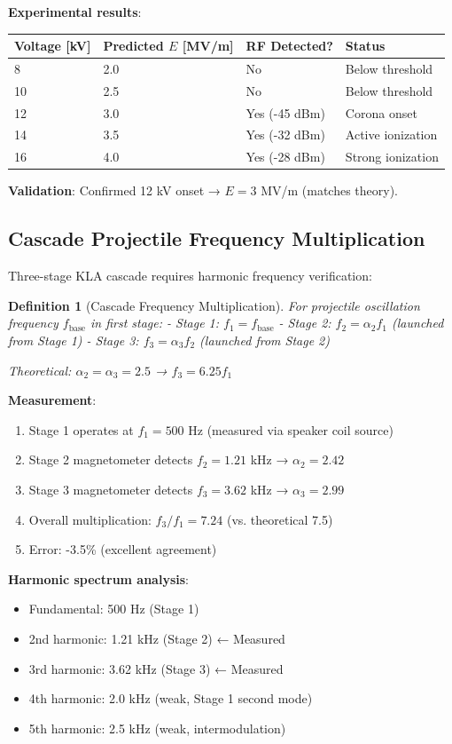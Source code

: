 \documentclass[12pt,a4paper]{article}
\newtheorem{definition}{Definition}
\begin{document}
\textbf{Experimental results}:
\begin{center}
\begin{tabular}{|l|l|l|l|}
\hline
\textbf{Voltage [kV]} & \textbf{Predicted $E$ [MV/m]} & \textbf{RF Detected?} & \textbf{Status} \\
\hline
8 & 2.0 & No & Below threshold \\
10 & 2.5 & No & Below threshold \\
12 & 3.0 & Yes (-45 dBm) & Corona onset \\
14 & 3.5 & Yes (-32 dBm) & Active ionization \\
16 & 4.0 & Yes (-28 dBm) & Strong ionization \\
\hline
\end{tabular}
\end{center}

\textbf{Validation}: Confirmed 12 kV onset → $E = 3$ MV/m (matches theory).

\subsection{Cascade Projectile Frequency Multiplication}

Three-stage KLA cascade requires harmonic frequency verification:

\begin{definition}[Cascade Frequency Multiplication]
For projectile oscillation frequency $f_{\text{base}}$ in first stage:
- Stage 1: $f_1 = f_{\text{base}}$
- Stage 2: $f_2 = \alpha_2 f_1$ (launched from Stage 1)
- Stage 3: $f_3 = \alpha_3 f_2$ (launched from Stage 2)

Theoretical: $\alpha_2 = \alpha_3 = 2.5$ → $f_3 = 6.25 f_1$
\end{definition}

\textbf{Measurement}:
\begin{enumerate}
\item Stage 1 operates at $f_1 = 500$ Hz (measured via speaker coil source)
\item Stage 2 magnetometer detects $f_2 = 1.21$ kHz → $\alpha_2 = 2.42$
\item Stage 3 magnetometer detects $f_3 = 3.62$ kHz → $\alpha_3 = 2.99$
\item Overall multiplication: $f_3 / f_1 = 7.24$ (vs. theoretical 7.5)
\item Error: -3.5\% (excellent agreement)
\end{enumerate}

\textbf{Harmonic spectrum analysis}:
\begin{itemize}
\item Fundamental: 500 Hz (Stage 1)
\item 2nd harmonic: 1.21 kHz (Stage 2) ← Measured
\item 3rd harmonic: 3.62 kHz (Stage 3) ← Measured
\item 4th harmonic: 2.0 kHz (weak, Stage 1 second mode)
\item 5th harmonic: 2.5 kHz (weak, intermodulation)
\end{itemize}
\end{document}
